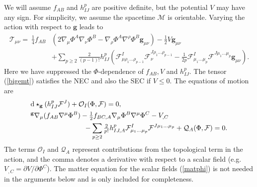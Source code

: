 \documentclass[11pt, reqno]{amsart}
\theoremstyle{plain}
\theoremstyle{definition}
\numberwithin{equation}{section}
\begin{document}
We will assume $f_{AB}$ and $h_{IJ}^p$ are positive definite, but the potential $V$ may have any sign. For simplicity, we assume the spacetime $\mathcal{M}$ is orientable. Varying the action with respect to $\textbf{g}$ leads to
\begin{align} \label{bigemt}
    \mathcal{T}_{\mu\nu} =\: \frac 14f_{AB}&\left(2\nabla_\mu\Phi^A\nabla_\nu\Phi^B -\nabla_\rho\Phi^A\nabla^\rho \Phi^B\textbf{g}_{\mu\nu}\right) - \frac 12V\textbf{g}_{\mu\nu}\nonumber\\ &+ \sum_{p\geq 2} \frac{2}{(p-1)!}h_{IJ}^p\left(\mathcal{F}^{I}_{\mu\rho_1\dots\rho_{p-1}}\mathcal{F}_\nu^{J\rho_1\dots\rho_{p-1
    }} - \frac{1}{2p}\mathcal{F}_{\mu_1\dots\mu_p}^I\mathcal{F}^{J\mu_1\dots\mu_p}\textbf{g}_{\mu\nu}
    \right).
\end{align}
Here we have suppressed the $\Phi$-dependence of $f_{AB}, V$ and $h_{IJ}^p$. The tensor (\ref{bigemt}) satisfies the NEC and also the SEC if $V \leq 0$. The equations of motion are
\begin{subequations} \label{mateqs}
\begin{align}
    &\text{d}\star_{\textbf{g}} (h_{IJ}^p\mathcal{F}^J) + \mathcal{O}_I(\Phi,\mathcal{F}) = 0, \label{matF}\\
    &{^\textbf{g}}\nabla_\mu(f_{AB}\nabla^\mu \Phi^B) -\tfrac12 f_{BC,A}\nabla_\mu\Phi^B\nabla^\mu\Phi^C - V_{,C} \nonumber\\&\hspace{2.7cm}- \sum_{p\geq2}\tfrac{2}{p!}h_{IJ,A}^p\mathcal{F}_{\mu_1\dots\mu_p}^I\mathcal{F}^{J\mu_1\dots\mu_p} + \mathcal{Q}_A(\Phi,\mathcal{F}) = 0. \label{matphi}
\end{align}
\end{subequations}
The terms $\mathcal{O}_I$ and $\mathcal{Q}_A$ represent contributions from the topological term in the action, and the comma denotes a derivative with respect to a scalar field (e.g. $V_{,C} = \partial V/ \partial\Phi^C$). The matter equation for the scalar fields (\ref{matphi}) is not needed in the arguments below and is only included for completeness.
\end{document}
